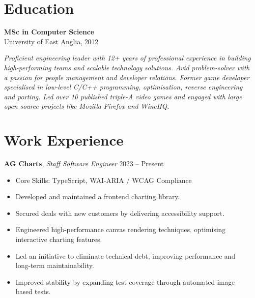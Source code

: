 \documentclass[a4paper,10pt]{article}
\newcommand{\coreskills}[1]{\item Core Skills: #1}
\newcommand{\xp}[3]{
  \vspace{1.0em}
  \textbf{#1}, \textit{#2} \hfill #3
  \vspace{0.3em}
}
\begin{document}
{\begin{minipage}[t]{0.24\textwidth}
{\begin{minipage}[t][\textheight]{\dimexpr\textwidth-10pt}
        \section*{\color{lightblue} Education}
        \textbf{MSc in Computer Science} \\
        University of East Anglia, 2012
        \vfill %
    \end{minipage}%
    }
\end{minipage}%
\hfill%
\begin{minipage}[t]{0.72\textwidth}
    \hspace{-1.55em}
    \colorbox{headerbg}{%
    \begin{minipage}[t]{\dimexpr\textwidth + 0.65em}
        \vspace{0.5cm} %
        \textit{Proficient engineering leader with 12+ years of professional experience in building high-performing teams and scalable technology solutions. Avid problem-solver with a passion for people management and developer relations. Former game developer specialised in low-level C/C++ programming, optimisation, reverse engineering and porting. Led over 10 published triple-A video games and engaged with large open source projects like Mozilla Firefox and WineHQ.}
        \vspace{0.3cm}
    \end{minipage}%
    }
    \section*{\color{navy} Work Experience}

    \vspace{-1.0em} %
    \xp{AG Charts}{Staff Software Engineer}{2023 -- Present}
    \begin{itemize}[leftmargin=1.5em, nosep]
        \coreskills{TypeScript, WAI-ARIA / WCAG Compliance}
        \item Developed and maintained a frontend charting library.
        \item Secured deals with new customers by delivering accessibility support.
        \item Engineered high-performance canvas rendering techniques, optimising interactive charting features.
        \item Led an initiative to eliminate technical debt, improving performance and long-term maintainability.
        \item Improved stability by expanding test coverage through automated image-based tests.
    \end{itemize}


\end{minipage}}
\end{document}
